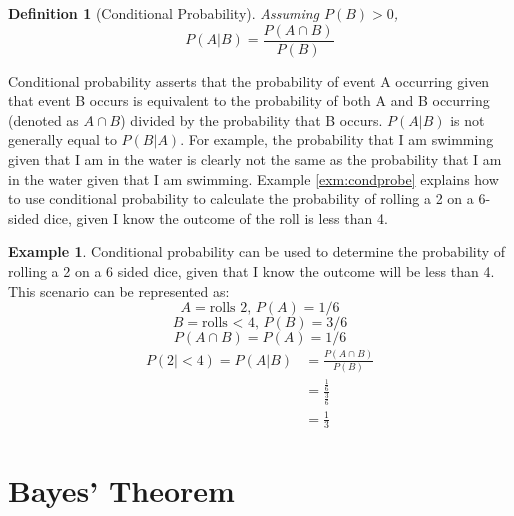 \documentclass[
  12pt,
  oneside]{book}
\theoremstyle{definition}
\newtheorem{definition}{Definition}[chapter]
\theoremstyle{definition}
\newtheorem{example}{Example}[chapter]
\theoremstyle{definition}
\theoremstyle{remark}
\begin{document}
\begin{definition}[Conditional Probability]
\protect\hypertarget{def:condprob}{}{\label{def:condprob} {} }\emph{Assuming \(P(B)>0\),}
\[P(A|B)=\frac{P(A \cap B)}{P(B)}\]
\end{definition}

Conditional probability asserts that the probability of event A occurring given that event B occurs is equivalent to the probability of both A and B occurring (denoted as \(A \cap B\)) divided by the probability that B occurs. \(P(A|B)\) is not generally equal to \(P(B|A)\).
For example, the probability that I am swimming given that I am in the water is clearly not the same as the probability that I am in the water given that I am swimming.
Example \ref{exm:condprobe} explains how to use conditional probability to calculate the probability of rolling a 2 on a 6-sided dice, given I know the outcome of the roll is less than 4.

\begin{example}
\protect\hypertarget{exm:condprobe}{}{\label{exm:condprobe} }Conditional probability can be used to determine the probability of rolling a 2 on a 6 sided dice, given that I know the outcome will be less than 4. This scenario can be represented as:
\[A = \textrm{rolls 2, } P(A) = 1/6\]
\[B = \textrm{rolls < 4, } P(B) = 3/6\]
\[P(A \cap B) = P(A) = 1/6\]
\[\begin{split}
P(2|<4) = P(A|B) & = \frac{P(A \cap B)}{P(B)} \\
  & = \frac{\frac{1}{6}}{\frac{3}{6}} \\
  & = \frac{1}{3}
\end{split}\]
\end{example}

\hypertarget{bayes-theorem}{%
\section{Bayes' Theorem}\label{bayes-theorem}}
\end{document}
